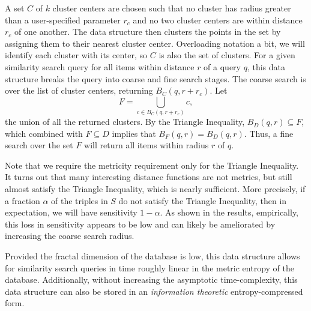 \documentclass[review,preprint,12pt]{elsarticle}
\theoremstyle{definition}
\theoremstyle{remark}
\begin{document}
A set $C$ of $k$ cluster centers are chosen such that no cluster has radius greater than a user-specified parameter $r_c$ and no two cluster centers are within distance $r_c$ of one another.
The data structure then clusters the points in the set by assigning them to their nearest cluster center.
Overloading notation a bit, we will identify each cluster with its center, so $C$ is also the set of clusters.
For a given similarity search query for all items within distance $r$ of a query $q$, this data structure breaks the query into coarse and fine search stages.
The coarse search is over the list of cluster centers, returning $B_C(q,r + r_c)$.
Let \[\displaystyle F = \bigcup_{c \in B_C(q,r+r_c)} c , \] the union of all the returned clusters.
By the Triangle Inequality, $B_D(q,r) \subseteq F$, which combined with $F \subseteq D$ implies that $B_F(q,r) = B_D(q,r)$.
Thus, a fine search over the set $F$ will return all items within radius $r$ of $q$.

Note that we require the metricity requirement only for the Triangle Inequality.
It turns out that many interesting distance functions are not metrics, but still almost satisfy the Triangle Inequality, which is nearly sufficient.
More precisely, if a fraction $\alpha$ of the triples in $S$ do not satisfy the Triangle Inequality, then in expectation, we will have sensitivity $1 - \alpha$.
As shown in the results, empirically, this loss in sensitivity appears to be low and can likely be ameliorated by increasing the coarse search radius.

Provided the fractal dimension of the database is low, this data structure allows for similarity search queries in time roughly linear in the metric entropy of the database.
Additionally, without increasing the asymptotic time-complexity, this data structure can also be stored in an \textit{information theoretic} entropy-compressed form.
\end{document}

